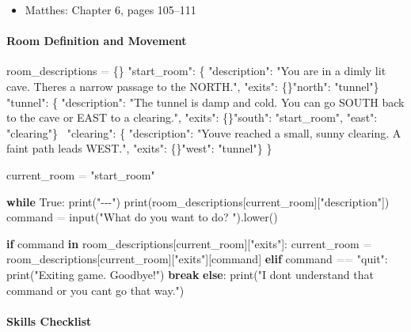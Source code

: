 \documentclass[
  justified,
  openright,
]{tufte-book}
\let\subsection\paragraph
\let\paragraph\paragraph
\newcommand{\KeywordTok}[1]{\textcolor{CodeKeyword}{\textbf{#1}}}  %
\newcommand{\StringTok}[1]{\textcolor{CodeString}{#1}}              %
\newcommand{\OperatorTok}[1]{\textcolor{DarkGray}{#1}}              %
\newenvironment{Shaded}{%
  \begin{mdframed}[style=TufteCode]%
}{%
  \end{mdframed}%
}
\let\subsection\paragraph
\let\paragraph\paragraph
\providecommand{\tightlist}{%
  \setlength{\itemsep}{0pt}\setlength{\parskip}{0pt}}
\begin{document}
\begin{itemize}
\tightlist
\item
  Matthes: Chapter 6, pages 105--111
\end{itemize}

\subsection{Room Definition and
Movement}\label{room-definition-and-movement}

\begin{Shaded}
\begin{Highlighting}[]
room\_descriptions \OperatorTok{=} \{\}
    \StringTok{"start\_room"}: \{
        \StringTok{"description"}: \StringTok{"You are in a dimly lit cave. There\textquotesingle{}s a narrow passage to the NORTH."},
        \StringTok{"exits"}: \{\}\StringTok{"north"}: \StringTok{"tunnel"}\}
    \,
    \StringTok{"tunnel"}: \{
        \StringTok{"description"}: \StringTok{"The tunnel is damp and cold. You can go SOUTH back to the cave or EAST to a clearing."},
        \StringTok{"exits"}: \{\}\StringTok{"south"}: \StringTok{"start\_room"}, \StringTok{"east"}: \StringTok{"clearing"}\}
    \,
    \StringTok{"clearing"}: \{
        \StringTok{"description"}: \StringTok{"You\textquotesingle{}ve reached a small, sunny clearing. A faint path leads WEST."},
        \StringTok{"exits"}: \{\}\StringTok{"west"}: \StringTok{"tunnel"}\}
    \}
\
 
current\_room \OperatorTok{=} \StringTok{"start\_room"}
 
\KeywordTok{while} True:
    print(\StringTok{"{-}{-}{-}"})
    print(room\_descriptions[current\_room][\StringTok{"description"}])
    command \OperatorTok{=} input(\StringTok{"What do you want to do? "}).lower()
 
    \KeywordTok{if} command \KeywordTok{in} room\_descriptions[current\_room][\StringTok{"exits"}]:
        current\_room \OperatorTok{=} room\_descriptions[current\_room][\StringTok{"exits"}][command]
    \KeywordTok{elif} command \OperatorTok{==} \StringTok{"quit"}:
        print(\StringTok{"Exiting game. Goodbye!"})
        \KeywordTok{break}
    \KeywordTok{else}:
        print(\StringTok{"I don\textquotesingle{}t understand that command or you can\textquotesingle{}t go that way."})
\end{Highlighting}
\end{Shaded}

\subsection{Skills Checklist}\label{skills-checklist-48}
\end{document}
